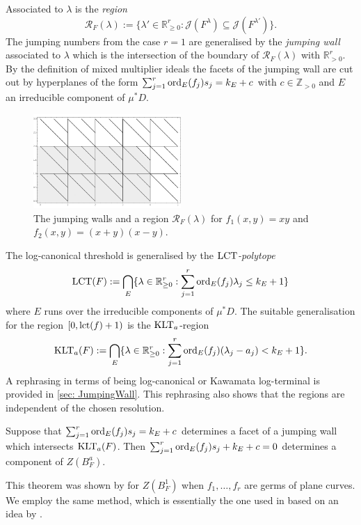 Associated to $\lambda$ is the {\it region} $$\mathcal{R}_F(\lambda):= \{\lambda'\in \mathbb{R}_{\geq 0}^r:\mathcal{J}(F^{\lambda}) \subseteq \mathcal{J}(F^{\lambda'})\}.$$
The jumping numbers from the case $r=1$ are generalised by the {\it jumping wall} associated to $\lambda$ which is the intersection of the boundary of $\mathcal{R}_F(\lambda)$ with $\mathbb{R}_{>0}^r$.
By the definition of mixed multiplier ideals the facets of the jumping wall are cut out by hyperplanes of the form
$\sum_{j=1}^r\operatorname{ord}_E(f_j)s_j = k_E + c$
with $c\in \mathbb{Z}_{>0}$ and $E$ an irreducible component of $\mu^*D$.
\begin{figure}\label{fig: Jumping}
    \centering
    \includegraphics[width = 0.5\textwidth]{Figures/LargeJumps}
    \caption{The jumping walls and a region $\mathcal{R}_F(\lambda)$ for $f_1(x,y) =xy$ and $f_2(x,y)=(x+y)(x-y)$.}
  \end{figure}

The log-canonical threshold is generalised by the {\it $\operatorname{LCT}$-polytope}
$$ \operatorname{LCT}(F) :=  \bigcap_{E}\{\lambda\in \mathbb{R}_{\geq 0}^r : \sum_{j=1}^r \operatorname{ord}_E(f_j)\lambda_j \leq k_E + 1\}$$
where $E$ runs over the irreducible components of $\mu^*D$.
The suitable generalisation for the region $[0,\operatorname{lct}(f) + 1)$ is the $\operatorname{KLT}_{a}$-region
$$\operatorname{KLT}_{a}(F):= \bigcap_{E}\{\lambda\in \mathbb{R}_{\geq 0}^r: \sum_{j=1}^r \operatorname{ord}_E(f_j)(\lambda_j - a_j) < k_E + 1\}.$$
A rephrasing in terms of being log-canonical or Kawamata log-terminal is provided in \cref{sec: JumpingWall}.
This rephrasing also shows that the regions are independent of the chosen resolution.
\begin{theorem}\label{thm: JumpingWall}
  Suppose that $\sum_{j=1}^r \operatorname{ord}_E(f_j)s_j = k_E + c$ determines a facet of a jumping wall which intersects $\operatorname{KLT}_{a}(F)$.
  Then $\sum_{j=1}^r \operatorname{ord}_E(f_j)s_j + k_E + c = 0$ determines a component of $Z(B_F^a)$.
\end{theorem}
This theorem was shown by \cite{cassou2011multivariable} for $Z(B_F^{1})$ when $f_1,\ldots, f_r$ are germs of plane curves.
We employ the same method, which is essentially the one used in \cite[Theorem B]{ClassicalJump} based on an idea by \cite{kollar1997singularities}.


